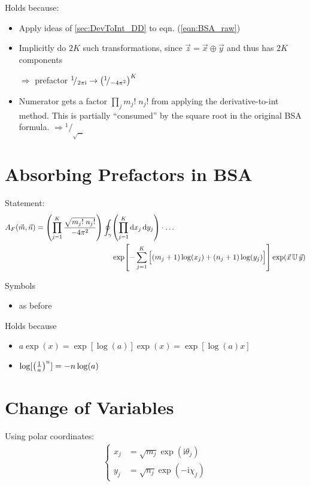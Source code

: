 \documentclass[
	english,
	a4paper,
	fontsize=10pt,
	parskip=half,
	titlepage=true,
	DIV=12,
	final
]{scrreprt}
\newcommand*{\thus}{\ensuremath{\rightarrow}\xspace}
\newcommand*{\Thus}{\ensuremath{\Rightarrow}\xspace}
\newcommand*{\smallfrac}  [2]{\ensuremath{{}^        {#1} \!/_        {#2}}}
\newcommand*{\iunit}{\ensuremath{\mathrm{i}}}
\begin{document}
Holds because:
\begin{itemize}
\item Apply ideas of \ref{sec:DevToInt_DD} to eqn. (\ref{eqn:BSA_raw})
\item Implicitly do $2K$ such transformations, since $\vec{z} = \vec{x} \oplus \vec{y}$ and thus has
	$2K$ components
\item[\Thus] prefactor $\smallfrac{1}{2\pi\iunit} \thus \qty( \smallfrac{1}{-4\pi^{2}} )^{K}$
\item Numerator gets a factor $\prod_{j} m_j! \; n_j!$ from applying the derivative-to-int method.
	This is partially \enquote{consumed} by the square root in the original BSA formula. \newline
	\Thus $\smallfrac{1}{\sqrt{\ldots}}$
\end{itemize}

\section{Absorbing Prefactors in BSA}
Statement:
\begin{align}
\nonumber
	A_F(\vec{m}, \vec{n})
=
	\qty(
		\prod_{j=1}^{K}
		\frac
			{\sqrt{m_j! \; n_j!}}
			{-4\pi^{2}}
	)
	\oint_{\gamma}
		& \qty(
			\prod_{j=1}^{K}
			\dd{x_j} \dd{y_j}
		)  \cdot \ldots \\
		& \exp[
			-\sum_{j=1}^{K} 
			\qty[ \Big.
				(m_j + 1) \log(x_j) +
				(n_j + 1) \log(y_j)
			]
		]
		\exp(\vec{x} \, \mathbb{U} \, \vec{y})
\label{eqn:BSA_IntAbsorbed}
\end{align}

Symbols
\begin{itemize}
\item as before
\end{itemize}

Holds because
\begin{itemize}
\item $a \exp(x) = \exp[\log(a)] \exp(x) = \exp[\log(a) x]$
\item $\log[ \qty( \frac{1}{a} )^{n} ] = -n \log(a)$
\end{itemize}

\section{Change of Variables}
\label{sec:BSA_phases}
Using polar coordinates:
\begin{align}
	\begin{cases}
	x_j &= \sqrt{m_j} \exp( \iunit \theta_j) \\
	y_j &= \sqrt{n_j} \exp(-\iunit \chi  _j) 	
	\end{cases}
	\label{eqn:DefXY}
\end{align}
\end{document}
